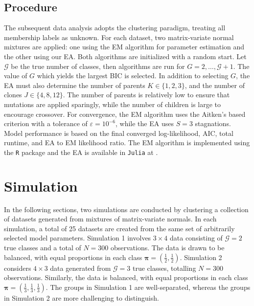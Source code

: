 \documentclass[12pt]{report}
\begin{document}
\section{Procedure}
The subsequent data analysis adopts the clustering paradigm, treating all membership labels as unknown. For each dataset, two matrix-variate normal mixtures are applied: one using the EM algorithm for parameter estimation and the other using our EA. Both algorithms are initialized with a random start. Let $\mathcal{G}$ be the true number of classes, then algorithms are run for $G=2,\dots, \mathcal{G} + 1$. The value of $G$ which yields the largest BIC is selected. In addition to selecting $G$, the EA must also determine the number of parents $K \in \{1, 2, 3\}$, and the number of clones $J \in \{4, 8, 12\}$. The number of parents is relatively low to ensure that mutations are applied sparingly, while the number of children is large to encourage crossover. For convergence, the EM algorithm uses the Aitken's based criterion with a tolerance of $\varepsilon =10^{-6}$, while the EA uses $S=3$ stagnations. Model performance is based on the final converged log-likelihood, AIC, total runtime, and EA to EM likelihood ratio. The EM algorithm is implemented using the \texttt{R} package \citet{matrixmixtures} and the EA is available in \texttt{Julia} at \citet{flynn2023} \citep{R, Julia}.






\chapter{Simulation}
In the following sections, two simulations are conducted by clustering a collection of datasets generated from mixtures of matrix-variate normals. In each simulation, a total of 25 datasets are created from the same set of arbitrarily selected model parameters. Simulation 1 involves $3 \times 4$ data consisting of $\mathcal{G}=2$ true classes and a total of $N=300$ observations. The data is drawn to be balanced, with equal proportions in each class $\bm{\pi} = (\frac{1}{2}, \frac{1}{2})$. Simulation 2 considers $4 \times 3$ data generated from $\mathcal{G} = 3$ true classes, totalling $N= 300$ observations. Similarly, the data is balanced, with equal proportions in each class $\bm{\pi} = (\frac{1}{3}, \frac{1}{3}, \frac{1}{3})$. The groups in Simulation 1 are well-separated, whereas the groups in Simulation 2 are more challenging to distinguish. 
\end{document}
